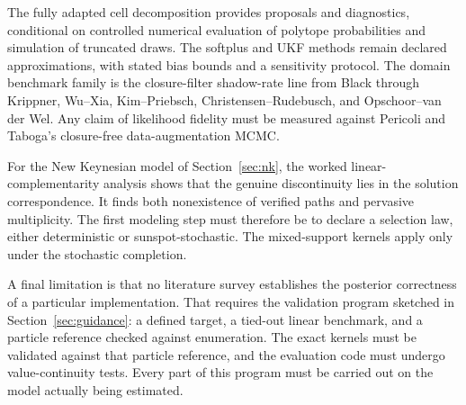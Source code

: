 \documentclass[11pt]{article}
\begin{document}
The fully adapted cell decomposition provides proposals and diagnostics,
conditional on controlled numerical evaluation of polytope probabilities and
simulation of truncated draws. The softplus and UKF methods remain declared
approximations, with stated bias bounds and a sensitivity protocol. The domain
benchmark family is the closure-filter shadow-rate line from Black through
Krippner, Wu--Xia, Kim--Priebsch, Christensen--Rudebusch, and Opschoor--van der
Wel. Any claim of likelihood fidelity must be measured against Pericoli and
Taboga's closure-free data-augmentation MCMC.

For the New Keynesian model of Section~\ref{sec:nk}, the worked linear-complementarity
analysis shows that the genuine discontinuity lies in the solution
correspondence. It finds both nonexistence of verified paths and pervasive
multiplicity. The first modeling step must therefore be to declare a selection
law, either deterministic or sunspot-stochastic. The mixed-support kernels
apply only under the stochastic completion.

A final limitation is that no literature survey establishes the posterior
correctness of a particular implementation. That requires the validation
program sketched in Section~\ref{sec:guidance}: a defined target, a tied-out linear
benchmark, and a particle reference checked against enumeration. The exact
kernels must be validated against that particle reference, and the evaluation
code must undergo value-continuity tests. Every part of this program must be
carried out on the model actually being estimated.
\end{document}
